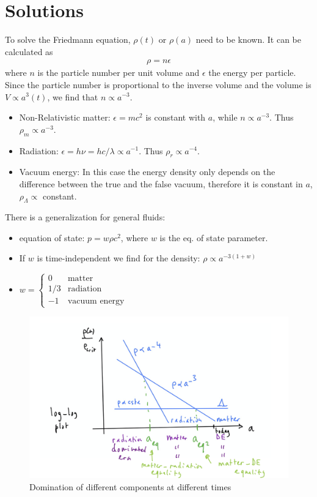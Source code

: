 \section{Solutions}

To solve the Friedmann equation, $\rho(t)$ or $\rho(a)$ need to be known. It can be calculated as
\begin{align*}
	\rho = n \epsilon
\end{align*}
where $n$ is the particle number per unit volume and $\epsilon$ the energy per particle. Since the particle number is proportional to the inverse volume and the volume is $V \propto a^3(t)$, we find that $n \propto a^{-3}$. 
\begin{itemize}
	\item Non-Relativistic matter: $\epsilon = mc^2$ is constant with $a$, while $n \propto a^{-3}$. Thus $\rho_m \propto a^{-3}$.
	\item Radiation: $\epsilon = h \nu = h c / \lambda \propto a^{-1}$. Thus $\rho_r \propto a^{-4}$.
	\item Vacuum energy: In this case the energy density only depends on the difference between the true and the false vacuum, therefore it is constant in $a$, $\rho_{\Lambda} \propto$ constant. 
\end{itemize}

There is a generalization for general fluids:
\begin{itemize}
	\item equation of state: $p = w \rho c^2$, where $w$ is the eq. of state parameter. 
	\item If $w$ is time-independent we find for the density: $\rho \propto a^{-3(1+w)}$
	\item $\displaystyle w = 
	\begin{cases}
	0 & \text{matter}\\
	1/3 & \text{radiation}\\
	-1 & \text{vacuum energy}
	\end{cases}
	$
\end{itemize}

\begin{figure}
	\centering
	\includegraphics[width=\textwidth]{img/ch-02/domination.png}
	\caption{Domination of different components at different times}
	\label{fig:domination}
\end{figure}

